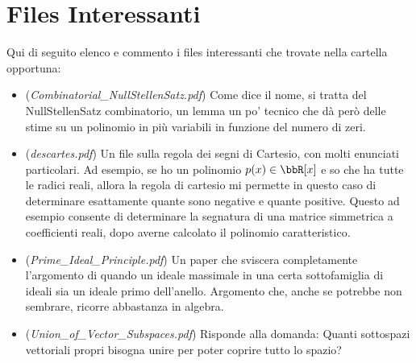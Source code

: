 \documentclass[a4paper,NoNotes,GeneralMath]{stdmdoc}
\theoremstyle{definition}
\newtheorem{spunto}{Spunto}
\begin{document}
	
	\section {Files Interessanti}
	Qui di seguito elenco e commento i files interessanti che trovate nella cartella opportuna:
	\begin{itemize}
		\item ({\it Combinatorial\_NullStellenSatz.pdf}) Come dice il nome, si tratta del NullStellenSatz combinatorio, un lemma un po' tecnico che dà però delle stime su un polinomio in più variabili in funzione del numero di zeri.
		\item ({\it descartes.pdf}) Un file sulla regola dei segni di Cartesio, con molti enunciati particolari. Ad esempio, se ho un polinomio $p(x) \in \bbR[x]$ e so che ha tutte le radici reali, allora la regola di cartesio mi permette in questo caso di determinare esattamente quante sono negative e quante positive. Questo ad esempio consente di determinare la segnatura di una matrice simmetrica a coefficienti reali, dopo averne calcolato il polinomio caratteristico.
		\item ({\it Prime\_Ideal\_Principle.pdf}) Un paper che sviscera completamente l'argomento di quando un ideale massimale in una certa sottofamiglia di ideali sia un ideale primo dell'anello. Argomento che, anche se potrebbe non sembrare, ricorre abbastanza in algebra.
		\item ({\it Union\_of\_Vector\_Subspaces.pdf}) Risponde alla domanda: Quanti sottospazi vettoriali propri bisogna unire per poter coprire tutto lo spazio?
	\end{itemize}
	
\end{document}
